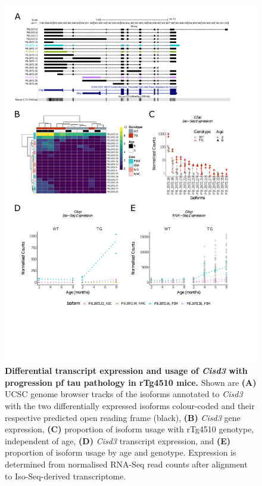 \newpage
\begin{figure}[!htp]
	\centering
	\includegraphics[page=4,trim={1.5cm 3.5cm 2cm 1cm}, scale = 0.80]{Figures/Ch5_DiffPlots.pdf}
	\captionsetup{width=0.95\textwidth}
	\caption[Differential \textit{Cisd3} transcript expression and usage]%
	{\textbf{Differential transcript expression and usage of \textit{Cisd3} with progression pf tau pathology in rTg4510 mice.} Shown are \textbf{(A)} UCSC genome browser tracks of the isoforms annotated to \textit{Cisd3} with the two differentially expressed isoforms colour-coded and their respective predicted open reading frame (black), \textbf{(B)} \textit{Cisd3} gene expression, \textbf{(C)} proportion of isoform usage with rTg4510 genotype, independent of age, \textbf{(D)} \textit{Cisd3} transcript expression, and \textbf{(E)} proportion of isoform usage by age and genotype. Expression is determined from normalised RNA-Seq read counts after alignment to Iso-Seq-derived transcriptome.}    
	\label{fig:DIU_Cisd3}
\end{figure}

